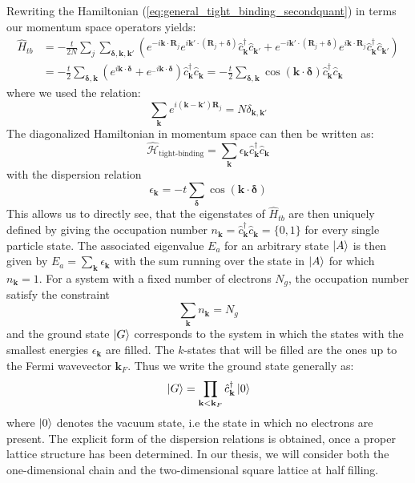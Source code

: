 \documentclass[11pt, a4paper, oneside]{book}
\theoremstyle{definition} %
\begin{document}
Rewriting the Hamiltonian (\ref{eq:general_tight_binding_secondquant}) in terms our momentum space operators yields:
\begin{equation}
\begin{split}
	\hat{H}_{tb} &= - \frac{t}{2N} \sum_j \sum_{\bm{\delta}, \mathbf{k}, \mathbf{k}'} (e^{-i \mathbf{k} \cdot \mathbf{R}_j} e^{i \mathbf{k}' \cdot (\mathbf{R}_j + \bm{\delta})} \hat{c}^\dagger_{\mathbf{k}} \hat{c}_{\mathbf{k}'} + e^{-i \mathbf{k}' \cdot (\mathbf{R}_j + \bm{\delta})} e^{i \mathbf{k} \cdot \mathbf{R}_j} \hat{c}_{\mathbf{k}}^\dagger \hat{c}_{\mathbf{k}'} ) \\
	&= -\frac{t}{2} \sum_{\bm{\delta}, \mathbf{k}} (e^{i \mathbf{k} \cdot \bm{\delta}} +  e^{_-i\mathbf{k} \cdot \bm{\delta}}) \hat{c}_{\mathbf{k}}^\dagger \hat{c}_{\mathbf{k}} = - \frac{t}{2} \sum_{\bm{\delta}, \mathbf{k}} \cos(\mathbf{k} \cdot \bm{\delta}) \hat{c}_{\mathbf{k}}^\dagger\hat{c}_{\mathbf{k}}
\end{split}
\end{equation}
where we used the relation:
\begin{equation}
	\sum_{\mathbf{k}} e^{i(\mathbf{k} - \mathbf{k}')\mathbf{R}_j} = N \delta_{\mathbf{k},\mathbf{k}'}
\end{equation}
The diagonalized Hamiltonian in momentum space can then be written as:
\begin{equation}
	\hat{\mathcal{H}}_{\text{tight-binding}} = \sum_{\mathbf{k}} \epsilon_{\mathbf{k}} \hat{c}_{\mathbf{k}}^\dagger \hat{c}_{\mathbf{k}}
\end{equation}
with the dispersion relation
\begin{equation}
	\epsilon_{\mathbf{k}} = -t\sum_{\bm{\delta}} \cos(\mathbf{k} \cdot \bm{\delta})
	\label{eq:dispersion_relation}
\end{equation}
This allows us to directly see, that the eigenstates of $\hat{H}_{tb}$ are then uniquely defined by giving the occupation number $n_{\mathbf{k}} = \hat{c}_{\mathbf{k}}^\dagger \hat{c}_{\mathbf{k}} = \{0,1\}$ for every single particle state. The associated eigenvalue $E_a$ for an arbitrary state $\ket{A}$ is then given by $E_a = \sum_{\mathbf{k}} \epsilon_\mathbf{k}$ with the sum running over the state in $\ket{A}$ for which $n_{\mathbf{k}} = 1$. For a system with a fixed number of electrons $N_g$, the occupation number satisfy the constraint
\begin{equation}
	\sum_{\mathbf{k}} n_{\mathbf{k}} = N_g
\end{equation}
and the ground state $\ket{G}$ corresponds to the system in which the states with the smallest energies $\epsilon_{\mathbf{k}}$ are filled. The $k$-states that will be filled are the ones up to the Fermi wavevector $\mathbf{k}_F$. Thus we write the ground state generally as:
\begin{equation}
	\ket{G} = \prod_{\mathbf{k} < \mathbf{k}_F} \hat{c}_{\mathbf{k}}^\dagger \ket{0}
\end{equation}
where $\ket{0}$ denotes the vacuum state, i.e the state in which no electrons are present. The explicit form of the dispersion relations is obtained, once a proper lattice structure has been determined. In our thesis, we will consider both the one-dimensional chain and the two-dimensional square lattice at half filling.
\end{document}

